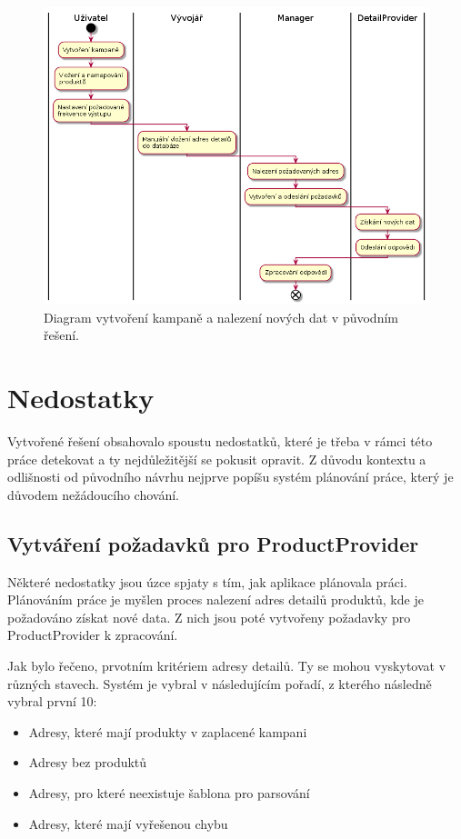 \documentclass[thesis=B,czech]{FITthesis}[2012/06/26]
\begin{document}
\begin{figure}[h]\centering
 	\includegraphics[width=1.0\textwidth]{resources/legacy-process-activity}
	\caption[Diagram zobrazující vytvoření kampaně a nalezení nových dat v původním řešení]
	{Diagram vytvoření kampaně a nalezení nových dat v původním řešení.}\label{fig:legacyprocess-activity}
\end{figure}

\section{Nedostatky}
Vytvořené řešení obsahovalo spoustu nedostatků, které je třeba v rámci této práce detekovat a ty nejdůležitější se pokusit opravit.
Z důvodu kontextu a odlišnosti od původního návrhu nejprve popíšu systém plánování práce, který je důvodem nežádoucího chování.

\subsection{Vytváření požadavků pro ProductProvider}
Některé nedostatky jsou úzce spjaty s tím, jak aplikace plánovala práci. Plánováním práce je myšlen proces
nalezení adres detailů produktů, kde je požadováno získat nové data. Z nich jsou poté vytvořeny požadavky pro ProductProvider k zpracování.
\par
Jak bylo řečeno, prvotním kritériem adresy detailů. Ty se mohou vyskytovat v různých stavech. Systém je vybral v 
následujícím pořadí, z kterého následně vybral první 10:

\begin{itemize}
\item Adresy, které mají produkty v zaplacené kampani
\item Adresy bez produktů
\item Adresy, pro které neexistuje šablona pro parsování
\item Adresy, které mají vyřešenou chybu
\end{itemize}
\end{document}
